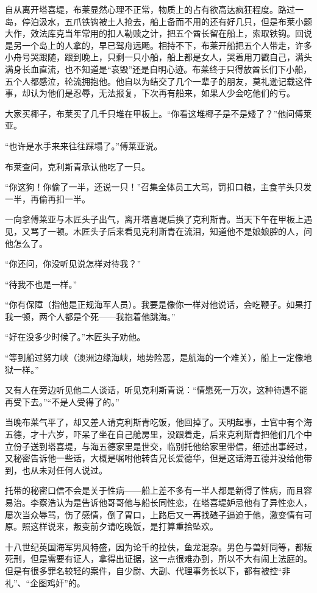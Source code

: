 \par 自从离开塔喜堤，布莱显然心理不正常，物质上的占有欲高达疯狂程度。路过一岛，停泊汲水，五爪铁钩被土人抢去，船上备而不用的还有好几只，但是布莱小题大作，效法库克当年常用的扣人勒赎之计，把五个酋长留在船上，索取铁钩。回说是另一个岛上的人拿的，早已驾舟远飏。相持不下，布莱开船把五个人带走，许多小舟号哭跟随，跟到晚上，只剩一只小船，船上都是女人，哭着用刀戳自己，满头满身长血直流，也不知道是“哀毁”还是自明心迹。布莱终于只得放酋长们下小船，五个人都感泣，轮流拥抱他。他自以为结交了几个一辈子的朋友，莫礼逊记载这件事，却认为他们是忍辱，无法报复，下次再有船来，如果人少会吃他们的亏。
\par 大家买椰子，布莱买了几千只堆在甲板上。“你看这堆椰子是不是矮了？”他问傅莱亚。
\par “也许是水手来来往往踩塌了。”傅莱亚说。
\par 布莱查问，克利斯青承认他吃了一只。
\par “你这狗！你偷了一半，还说一只！”召集全体员工大骂，罚扣口粮，主食芋头只发一半，再偷再扣一半。
\par 一向拿傅莱亚与木匠头子出气，离开塔喜堤后换了克利斯青。当天下午在甲板上遇见，又骂了一顿。木匠头子后来看见克利斯青在流泪，知道他不是娘娘腔的人，问他怎么了。
\par “你还问，你没听见说怎样对待我？”
\par “待我不也是一样。”
\par “你有保障（指他是正规海军人员）。我要是像你一样对他说话，会吃鞭子。如果打我一顿，两个人都是个死——我抱着他跳海。”
\par “好在没多少时候了。”木匠头子劝他。
\par “等到船过努力峡（澳洲边缘海峡，地势险恶，是航海的一个难关），船上一定像地狱一样。”
\par 又有人在旁边听见他二人谈话，听见克利斯青说：“情愿死一万次，这种待遇不能再受下去。”“不是人受得了的。”
\par 当晚布莱气平了，却又差人请克利斯青吃饭，他回掉了。天明起事，士官中有个海五德，才十六岁，吓呆了坐在自己舱房里，没跟着走，后来克利斯青把他们几个中立份子送到塔喜堤，与海五德家里是世交，临别托他给家里带信，细述出事经过，又秘密告诉他一些话，大概是嘱咐他转告兄长爱德华，但是这话海五德并没给他带到，也从未对任何人说过。
\par 托带的秘密口信不会是关于性病——船上差不多有一半人都是新得了性病，而且容易治。李察浩认为是告诉他哥哥他与船长同性恋，在塔喜堤妒忌他有了异性恋人，屡次当众辱骂，伤了感情，倒了胃口，上路后又一再找碴子逼迫于他，激变情有可原。照这样说来，叛变前夕请吃晚饭，是打算重拾坠欢。
\par 十八世纪英国海军男风特盛，因为论千的拉伕，鱼龙混杂。男色与兽奸同等，都叛死刑，但是需要有证人，拿得出证据，这一点很难办到，所以不大有闹上法庭的。但是有很多罪名较轻的案件，自少尉、大副、代理事务长以下，都有被控“非礼”、“企图鸡奸”的。
